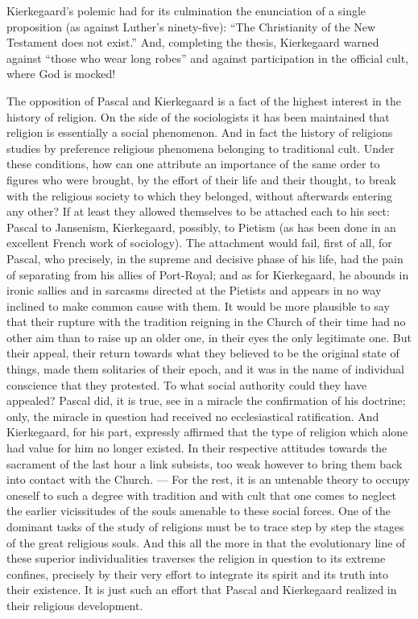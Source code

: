 \documentclass[12pt,a4paper]{article}
\newcommand{\opage}[1]{\marginnote{\footnotesize\textit{[#1]}}}
\begin{document}
Kierkegaard's polemic had for its culmination the enunciation of a single
proposition (as against Luther's ninety-five): ``The Christianity of the New
Testament does not exist.'' And, completing the thesis, Kierkegaard warned
against ``those who wear long robes'' and against participation in the official
cult, where God is mocked!

The opposition of Pascal and Kierkegaard is a fact of the highest interest in
the history of religion. On the side of the sociologists it has been maintained
that religion is essentially a social phenomenon. And in fact the history of
religions studies by preference religious phenomena belonging to traditional
cult. Under these conditions, how can one attribute an importance of the same
order to figures who were brought, by the effort of their life and their
thought, to break with the religious society to which they belonged, without
afterwards entering any other? If at least they allowed themselves to be
attached each to his sect: Pascal to Jansenism, Kierkegaard, possibly, to
Pietism (as has been done in an excellent French work of sociology). The
attachment would fail, first of all, for Pascal, who precisely, in the supreme
and decisive phase of his life, had the pain of separating from his allies of
Port-Royal; and as for Kierkegaard, he abounds in ironic sallies and in sarcasms
directed at the Pietists and appears in no way inclined to make common cause
with them. It would be more plausible to say that their rupture with the
tradition reigning in the Church of their time had no other aim than to raise up
an older one, in their eyes the only legitimate one. But their appeal, their
return towards what they believed to be the original state of things, made them
solitaries of their epoch, and it was in the name of individual conscience that
they protested. To what social authority could they have
appealed? Pascal did, it is true, see in a miracle the \opage{242}confirmation of his
doctrine; only, the miracle in question had received no ecclesiastical
ratification. And Kierkegaard, for his part, expressly affirmed that the type of
religion which alone had value for him no longer existed. In their respective
attitudes towards the sacrament of the last hour a link subsists, too weak
however to bring them back into contact with the Church. --- For the rest, it is
an untenable theory to occupy oneself to such a degree with tradition and with
cult that one comes to neglect the earlier vicissitudes of the souls amenable to
these social forces. One of the dominant tasks of the study of religions must be
to trace step by step the stages of the great religious souls. And this all the
more in that the evolutionary line of these superior individualities traverses
the religion in question to its extreme confines, precisely by their very effort
to integrate its spirit and its truth into their existence. It is just such an
effort that Pascal and Kierkegaard realized in their religious development.
\end{document}
